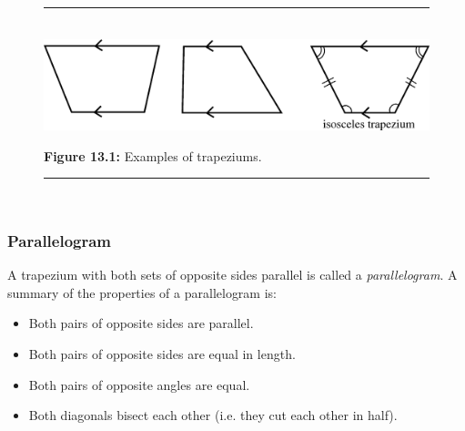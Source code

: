 	\begin{figure}[H] %
    \begin{center}
    \rule[.1in]{\figurerulewidth}{.005in} \\
        \label{m39354*uid55!!!underscore!!!media}\label{m39354*uid55!!!underscore!!!printimage}\includegraphics{col11306.imgs/m39354_MG10C13_040.png} %
        
      \vspace{2pt}
    \vspace{\rubberspace}\par \begin{cnxcaption}
	  \small \textbf{Figure 13.1: }Examples of trapeziums.
	\end{cnxcaption}
      
    \vspace{.1in}
    \rule[.1in]{\figurerulewidth}{.005in} \\
        
    \end{center}

 \end{figure}   

    \addtocounter{footnote}{-0}
    
        
        \label{m39354*uid56}
            \subsubsection{ Parallelogram}
            \nopagebreak
            
          
          \label{m39354*id318843}A trapezium with both sets of opposite sides parallel is called a \textsl{parallelogram}. A summary of the properties of a parallelogram is:\par 
          \label{m39354*id318853}\begin{itemize}[noitemsep]
            \label{m39354*uid57}\item Both pairs of opposite sides are parallel.
\label{m39354*uid58}\item Both pairs of opposite sides are equal in length.
\label{m39354*uid59}\item Both pairs of opposite angles are equal.
\label{m39354*uid60}\item Both diagonals bisect each other (i.e. they cut each other in half).
\end{itemize}
        
